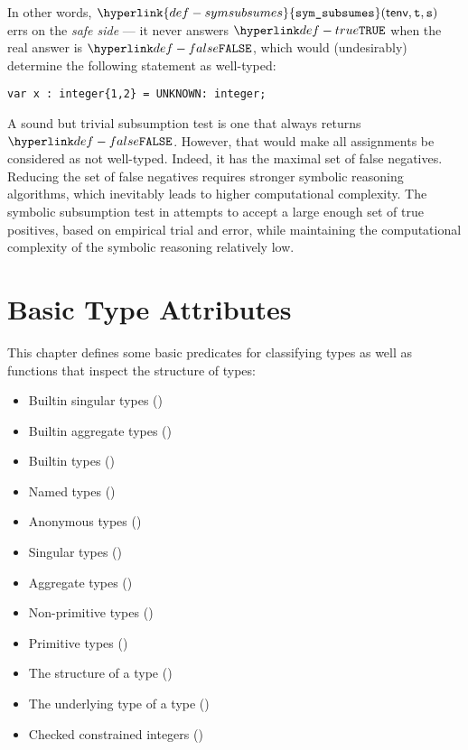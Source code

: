 \documentclass{book}
\newcommand\symsubsumes[0]{\hyperlink{def-symsubsumes}{\texttt{sym\_subsumes}}}
\newcommand\vt[0]{\texttt{t}}
\newcommand\vs[0]{\texttt{s}}
\begin{document}
In other words, $\symsubsumes(\tenv, \vt, \vs)$ errs on the \emph{safe side} ---
it never answers $\True$ when the real answer is $\False$, which would (undesirably)
determine the following statement as well-typed:
\begin{center}
  \verb|var x : integer{1,2} = UNKNOWN: integer;|
\end{center}

A sound but trivial subsumption test is one that always returns $\False$.
However, that would make all assignments be considered as not well-typed.
Indeed, it has the maximal set of false negatives.
Reducing the set of false negatives requires stronger symbolic reasoning algorithms,
which inevitably leads to higher computational complexity.
%
The symbolic subsumption test in 
attempts to accept a large enough set of true positives, based on empirical trial and error,
while maintaining the computational complexity of the symbolic reasoning relatively low.

\chapter{Basic Type Attributes}

This chapter defines some basic predicates for classifying types as well as
functions that inspect the structure of types:
\begin{itemize}
  \item Builtin singular types ()
  \item Builtin aggregate types ()
  \item Builtin types ()
  \item Named types ()
  \item Anonymous types ()
  \item Singular types ()
  \item Aggregate types ()
  \item Non-primitive types ()
  \item Primitive types ()
  \item The structure of a type ()
  \item The underlying type of a type ()
  \item Checked constrained integers ()
\end{itemize}
\end{document}
